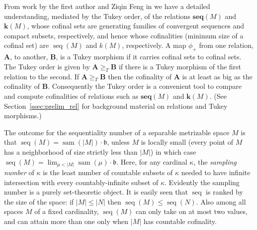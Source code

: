 \documentclass{article}
\newcommand{\tq}{\ge_T}
\begin{document}
From work by the first author and Ziqin Feng in \cite{FG_Shape} we have a detailed understanding, mediated by the Tukey order, of the relations $\mathbf{seq}(M)$ and $\mathbf{k}(M)$,  whose cofinal sets are generating families of convergent sequences and compact subsets, respectively, and hence whose cofinalities (minimum size of a cofinal set) are $\mathop{seq}(M)$ and $k(M)$, respectively. 
 A map $\phi_+$ from one relation, $\mathbf{A}$, to another, $\mathbf{B}$, is a Tukey morphism if it carries cofinal sets to cofinal sets. The Tukey order is given by $\mathbf{A} \tq \mathbf{B}$ if there is a Tukey morphism of the first relation to the second. If $\mathbf{A} \tq \mathbf{B}$ then the cofinality of $\mathbf{A}$ is at least as big as the cofinality of $\mathbf{B}$. Consequently the Tukey order is a convenient tool to compare and compute cofinalities of relations such as $\mathbf{seq}(M)$ and $\mathbf{k}(M)$. 
(See Section~\ref{ssec:prelim_rel} for background material on relations and Tukey morphisms.) 

The outcome for the sequentiality number of a separable metrizable space $M$ is that $\mathop{seq}(M)=\mathop{sam}(|M|)\cdot \mathfrak{b}$,  unless $M$ is locally small (every point of $M$ has a neighborhood of size strictly less than $|M|$) in which case $\mathop{seq}(M)=\lim_{\mu <|M|} \mathop{sam}(\mu)\cdot \mathfrak{b}$. 
Here, for any cardinal $\kappa$, the \emph{sampling number} of $\kappa$ is the least number of countable subsets of $\kappa$ needed to have infinite intersection with every countably-infinite subset of $\kappa$.  Evidently the sampling number is a purely set-theoretic object. It is easily seen that $\mathop{seq}$ is ranked by the size of the space: if $|M| \le |N|$ then $\mathop{seq}(M) \le \mathop{seq}(N)$. Also among all spaces $M$ of a fixed cardinality, $\mathop{seq}(M)$ can only take on at most two values, and can attain more than one only when $|M|$ has countable cofinality. 
\end{document}
